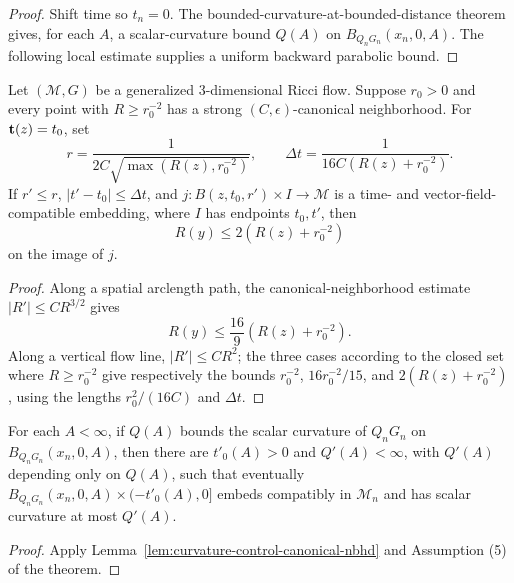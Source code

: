 \begin{proof}
\sketch Shift time so $t_n=0$. The bounded-curvature-at-bounded-distance
theorem gives, for each $A$, a scalar-curvature bound $Q(A)$ on
$B_{Q_nG_n}(x_n,0,A)$. The following local estimate supplies a uniform
backward parabolic bound.
\end{proof}

\begin{lemma}
\label{lem:curvature-control-canonical-nbhd}
\label{controlnbhd}
Let $({\mathcal M},G)$ be a generalized $3$-dimensional Ricci flow. Suppose
$r_0>0$ and every point with $R\ge r_0^{-2}$ has a strong
$(C,\epsilon)$-canonical neighborhood. For ${\bf t}(z)=t_0$, set
$$r=\frac{1}{2C\sqrt{\max(R(z),r_0^{-2})}},\qquad
\Delta t=\frac{1}{16C(R(z)+r_0^{-2})}.$$
If $r'\le r$, $|t'-t_0|\le\Delta t$, and
$j:B(z,t_0,r')\times I\to{\mathcal M}$ is a time- and vector-field-compatible
embedding, where $I$ has endpoints $t_0,t'$, then
$$R(y)\le2(R(z)+r_0^{-2})$$
on the image of $j$.
\end{lemma}

\begin{proof}
\sketch Along a spatial arclength path, the canonical-neighborhood estimate
$|R'|\le CR^{3/2}$ gives
\begin{equation}\label{Rineq}
R(y)\le\frac{16}{9}(R(z)+r_0^{-2}).
\end{equation}
Along a vertical flow line, $|R'|\le CR^2$; the three cases according to
the closed set where $R\ge r_0^{-2}$ give respectively the bounds
$r_0^{-2}$, $16r_0^{-2}/15$, and $2(R(z)+r_0^{-2})$, using the lengths
$r_0^2/(16C)$ and $\Delta t$.
\end{proof}

\begin{corollary}
\label{cor:uniform-backward-curvature-bound}
\label{cnnbhd2}
For each $A<\infty$, if $Q(A)$ bounds the scalar curvature of
$Q_nG_n$ on $B_{Q_nG_n}(x_n,0,A)$, then there are $t'_0(A)>0$ and
$Q'(A)<\infty$, with $Q'(A)$ depending only on $Q(A)$, such that eventually
$B_{Q_nG_n}(x_n,0,A)\times(-t'_0(A),0]$ embeds compatibly in
${\mathcal M}_n$ and has scalar curvature at most $Q'(A)$.
\end{corollary}
\begin{proof}\sketch Apply Lemma~\ref{lem:curvature-control-canonical-nbhd} and
Assumption (5) of the theorem.\end{proof}

